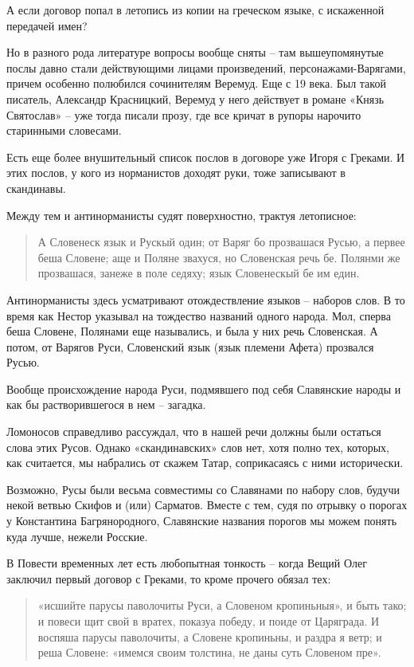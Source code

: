 А если договор попал в летопись из копии на греческом языке, с искаженной передачей имен?

Но в разного рода литературе вопросы вообще сняты – там вышеупомянутые послы давно стали действующими лицами произведений, персонажами-Варягами, причем особенно полюбился сочинителям Веремуд. Еще с 19 века. Был такой писатель, Александр Красницкий, Веремуд у него действует в романе «Князь Святослав» – уже тогда писали прозу, где все кричат в рупоры нарочито старинными словесами.

Есть еще более внушительный список послов в договоре уже Игоря с Греками. И этих послов, у кого из норманистов доходят руки, тоже записывают в скандинавы.

Между тем и антинорманисты судят поверхностно, трактуя летописное:

\begin{quotation}
А Словенеск язык и Рускый один; от Варяг бо прозвашася Русью, а первее беша Словене; аще и Поляне звахуся, но Словенская речь бе. Полянми же прозвашася, занеже в поле седяху; язык Словенескый бе им един.
\end{quotation}

Антинорманисты здесь усматривают отождествление языков – наборов слов. В то время как Нестор указывал на тождество названий одного народа. Мол, сперва беша Словене, Полянами еще назывались, и была у них речь Словенская. А потом, от Варягов Руси, Словенский язык (язык племени Афета) прозвался Русью.

Вообще происхождение народа Руси, подмявшего под себя Славянские народы и как бы растворившегося в нем – загадка. 

Ломоносов справедливо рассуждал, что в нашей речи должны были остаться слова этих Русов. Однако «скандинавских» слов нет, хотя полно тех, которых, как считается, мы набрались от скажем Татар, соприкасаясь с ними исторически. 

Возможно, Русы были весьма совместимы со Славянами по набору слов, будучи некой ветвью Скифов и (или) Сарматов. Вместе с тем, судя по отрывку о порогах у Константина Багрянородного, Славянские названия порогов мы можем понять куда лучше, нежели Росские.

В Повести временных лет есть любопытная тонкость – когда Вещий Олег заключил первый договор с Греками, то кроме прочего обязал тех: 

\begin{quotation}
«исшийте парусы паволочиты Руси, а Словеном кропиньныя», и быть тако; и повеси щит свой в вратех, показуа победу, и поиде от Царяграда. И воспяша парусы паволочиты, а Словене кропиньны, и раздра я ветр; и реша Словене: «имемся своим толстина, не даны суть Словеном пре».
\end{quotation}

